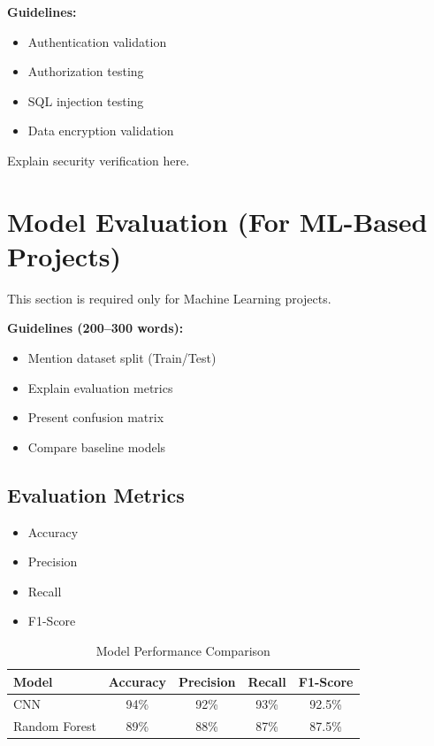 \textbf{Guidelines:}
\begin{itemize}
    \item Authentication validation
    \item Authorization testing
    \item SQL injection testing
    \item Data encryption validation
\end{itemize}

Explain security verification here.


\section{Model Evaluation (For ML-Based Projects)}

This section is required only for Machine Learning projects.

\textbf{Guidelines (200–300 words):}
\begin{itemize}
    \item Mention dataset split (Train/Test)
    \item Explain evaluation metrics
    \item Present confusion matrix
    \item Compare baseline models
\end{itemize}

\subsection{Evaluation Metrics}

\begin{itemize}
    \item Accuracy
    \item Precision
    \item Recall
    \item F1-Score
\end{itemize}

\begin{table}[h]
\centering
\caption{Model Performance Comparison}
\renewcommand{\arraystretch}{1.3}
\begin{tabular*}{\textwidth}{@{\extracolsep{\fill}}lcccc}
\toprule
\textbf{Model} & \textbf{Accuracy} & \textbf{Precision} & \textbf{Recall} & \textbf{F1-Score} \\
\midrule
CNN & 94\% & 92\% & 93\% & 92.5\% \\
Random Forest & 89\% & 88\% & 87\% & 87.5\% \\
\bottomrule
\end{tabular*}
\end{table}



